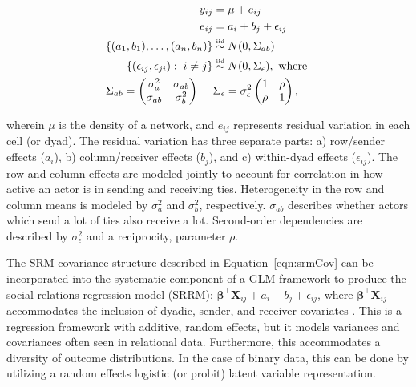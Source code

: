 \documentclass[12pt]{amsart}
\newcommand\simiid{\stackrel{\mathclap{\normalfont\mbox{\tiny{iid}}}}{\sim}}\usepackage{natbib}
\begin{document}
\begin{align}
\begin{aligned}
	y_{ij} &= \mu + e_{ij} \\
	e_{ij} &= a_{i} + b_{j} + \epsilon_{ij} \\
	\{ (a_{1}, b_{1}), \ldots, (a_{n}, b_{n}) \} &\simiid N(0,\Sigma_{ab}) \\ 
	\{ (\epsilon_{ij}, \epsilon_{ji}) : \; i \neq j\} &\simiid N(0,\Sigma_{\epsilon}), \text{ where } \\
	\Sigma_{ab} = \begin{pmatrix} \sigma_{a}^{2} & \sigma_{ab} \\ \sigma_{ab} & \sigma_{b}^2   \end{pmatrix} \;\;\;\;\; &\Sigma_{\epsilon} = \sigma_{\epsilon}^{2} \begin{pmatrix} 1 & \rho \\ \rho & 1  \end{pmatrix},
\label{eqn:srmCov}
\end{aligned}
\end{align}

wherein $\mu$ is the density of a network, and $e_{ij}$ represents residual variation in each cell (or dyad). The residual variation has three separate parts: a)   row/sender effects ($a_{i}$), b)  column/receiver effects ($b_{j}$), and c) within-dyad effects ($\epsilon_{ij}$). The row and column effects are modeled jointly to account for correlation in how active an actor is in sending and receiving ties. Heterogeneity in the row and column means is modeled by $\sigma_{a}^{2}$ and $\sigma_{b}^{2}$, respectively.  $\sigma_{ab}$ describes whether actors which send a lot of ties also receive a lot. Second-order dependencies are described by $\sigma_{\epsilon}^{2}$ and a reciprocity, parameter $\rho$. 

The SRM covariance structure described in Equation~\ref{eqn:srmCov} can be incorporated into the systematic component of a GLM framework to produce the social relations regression model (SRRM): $\bm\beta^{\top} \mathbf{X}_{ij} + a_{i} + b_{j} + \epsilon_{ij}$, where $ \bm\beta^{\top} \mathbf{X}_{ij}$ accommodates the inclusion of dyadic, sender, and receiver covariates \citep{hoff:2005}. This is a regression framework with additive, random effects, but it models variances and covariances often seen in relational data. Furthermore, this accommodates a diversity of outcome distributions. In the case of binary data, this can be done by utilizing a random effects logistic (or probit) latent variable representation. 
\end{document}
